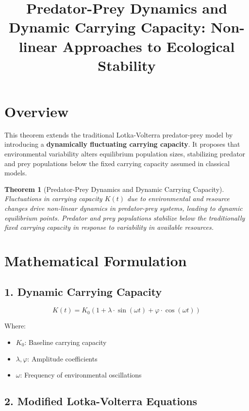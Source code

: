 \documentclass[12pt]{article}
\title{Predator-Prey Dynamics and Dynamic Carrying Capacity: Non-linear Approaches to Ecological Stability}
\author{}
\date{}
\newtheorem{theorem}{Theorem}
\begin{document}
\maketitle

\section*{Overview}

This theorem extends the traditional Lotka-Volterra predator-prey model by introducing a \textbf{dynamically fluctuating carrying capacity}. It proposes that environmental variability alters equilibrium population sizes, stabilizing predator and prey populations below the fixed carrying capacity assumed in classical models.

\begin{theorem}[Predator-Prey Dynamics and Dynamic Carrying Capacity]
Fluctuations in carrying capacity \( K(t) \) due to environmental and resource changes drive non-linear dynamics in predator-prey systems, leading to dynamic equilibrium points. Predator and prey populations stabilize below the traditionally fixed carrying capacity in response to variability in available resources.
\end{theorem}

\section*{Mathematical Formulation}

\subsection*{1. Dynamic Carrying Capacity}

\[
K(t) = K_0 \left( 1 + \lambda \cdot \sin(\omega t) + \varphi \cdot \cos(\omega t) \right)
\]

Where:
\begin{itemize}
  \item \( K_0 \): Baseline carrying capacity
  \item \( \lambda, \varphi \): Amplitude coefficients
  \item \( \omega \): Frequency of environmental oscillations
\end{itemize}

\subsection*{2. Modified Lotka-Volterra Equations}
\end{document}
